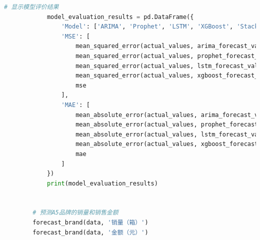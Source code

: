 \documentclass[a4paper]{article}
\begin{document}
\begin{lstlisting}[language=Python]
			# 显示模型评价结果
			model_evaluation_results = pd.DataFrame({
				'Model': ['ARIMA', 'Prophet', 'LSTM', 'XGBoost', 'Stacking'],
				'MSE': [
					mean_squared_error(actual_values, arima_forecast_values[:len(actual_values)]),
					mean_squared_error(actual_values, prophet_forecast_values[:len(actual_values)]),
					mean_squared_error(actual_values, lstm_forecast_values[:len(actual_values)]),
					mean_squared_error(actual_values, xgboost_forecast_values[:len(actual_values)]),
					mse
				],
				'MAE': [
					mean_absolute_error(actual_values, arima_forecast_values[:len(actual_values)]),
					mean_absolute_error(actual_values, prophet_forecast_values[:len(actual_values)]),
					mean_absolute_error(actual_values, lstm_forecast_values[:len(actual_values)]),
					mean_absolute_error(actual_values, xgboost_forecast_values[:len(actual_values)]),
					mae
				]
			})
			print(model_evaluation_results)
		
		
		# 预测A5品牌的销量和销售金额
		forecast_brand(data, '销量（箱）')
		forecast_brand(data, '金额（元）')
	\end{lstlisting}
	
	
	
\end{document}

